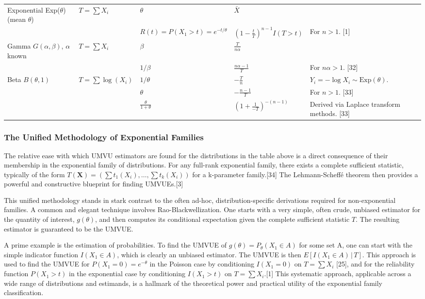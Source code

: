 \documentclass[11pt, letterpaper]{article}
\newcommand{\given}{\,|\,}
\begin{document}
\begin{longtable}{>{\raggedright}p{4cm} >{\raggedright}p{4cm} >{\centering}p{2.5cm} >{\raggedright}p{4cm} >{\raggedright\arraybackslash}p{2.5cm}}
\midrule
Exponential Exp($\theta$) (mean $\theta$) & $T=\sum X_i$ & $\theta$ & $\bar{X}$ & [1] \\
& & $R(t) = P(X_1>t) = e^{-t/\theta}$ & $(1-\frac{t}{T})^{n-1} I(T>t)$ & For $n>1$. [1] \\
\midrule
Gamma $G(\alpha, \beta)$, $\alpha$ known & $T=\sum X_i$ & $\beta$ & $\frac{T}{n\alpha}$ & [32] \\
& & $1/\beta$ & $\frac{n\alpha-1}{T}$ & For $n\alpha>1$. [32] \\
\midrule
Beta $B(\theta,1)$ & $T=\sum \log(X_i)$ & $1/\theta$ & $-\frac{T}{n}$ & $Y_i = -\log X_i \sim \text{Exp}(\theta)$. \\
& & $\theta$ & $-\frac{n-1}{T}$ & For $n>1$. [33] \\
& & $\frac{\theta}{1+\theta}$ & $(1+\frac{1}{-T})^{-(n-1)}$ & Derived via Laplace transform methods. [33] \\
\end{longtable}


\subsubsection*{The Unified Methodology of Exponential Families}
The relative ease with which UMVU estimators are found for the distributions in the table above is a direct consequence of their membership in the exponential family of distributions. For any full-rank exponential family, there exists a complete sufficient statistic, typically of the form $T(\mathbf{X}) = (\sum t_1(X_i), \dots, \sum t_k(X_i))$ for a k-parameter family.[34] The Lehmann-Scheffé theorem then provides a powerful and constructive blueprint for finding UMVUEs.[3]

This unified methodology stands in stark contrast to the often ad-hoc, distribution-specific derivations required for non-exponential families. A common and elegant technique involves Rao-Blackwellization. One starts with a very simple, often crude, unbiased estimator for the quantity of interest, $g(\theta)$, and then computes its conditional expectation given the complete sufficient statistic $T$. The resulting estimator is guaranteed to be the UMVUE.

A prime example is the estimation of probabilities. To find the UMVUE of $g(\theta) = P_\theta(X_1 \in A)$ for some set A, one can start with the simple indicator function $I(X_1 \in A)$, which is clearly an unbiased estimator. The UMVUE is then $E[I(X_1 \in A) \given T]$. This approach is used to find the UMVUE for $P(X_1=0)=e^{-\theta}$ in the Poisson case by conditioning $I(X_1=0)$ on $T=\sum X_i$ [25], and for the reliability function $P(X_1>t)$ in the exponential case by conditioning $I(X_1>t)$ on $T=\sum X_i$.[1] This systematic approach, applicable across a wide range of distributions and estimands, is a hallmark of the theoretical power and practical utility of the exponential family classification.
\end{document}
